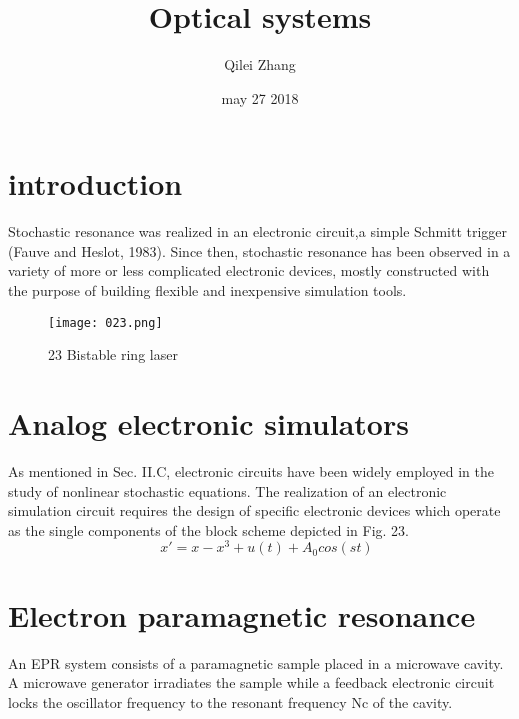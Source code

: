 \documentclass[10pt,twocolumn,letterpaper]{article}
\begin{document}
\title{Optical systems}
\author{Qilei Zhang}
\date{may 27 2018}
\maketitle
\section{introduction}
  Stochastic resonance was realized in an electronic circuit,a simple Schmitt trigger (Fauve and Heslot, 1983). Since then, stochastic resonance has been observed in a variety of more or less complicated electronic devices, mostly constructed with the purpose of building flexible and inexpensive simulation tools.
\begin{figure}[htbp]
\small
\centering
\texttt{[image: 023.png]}
\caption{23 Bistable ring laser}
\label{fig:lable}
\end{figure}
\section{Analog electronic simulators}
As mentioned in Sec. II.C, electronic circuits have been widely employed in the study of nonlinear stochastic equations.\cite{Alpher02} The realization of an electronic simulation circuit requires the design of specific electronic devices which operate as the single components of the block scheme depicted in Fig. 23.
\begin{equation}
\quad x'=x-x^3+u(t)+A_0 cos(st)
\end{equation}
\section{Electron paramagnetic resonance}
An EPR system consists of a paramagnetic sample placed in a microwave cavity. A microwave generator irradiates the sample while a feedback electronic circuit locks the oscillator frequency to the resonant frequency Nc of the cavity.\cite{Alpher04}\\
\end{document}
